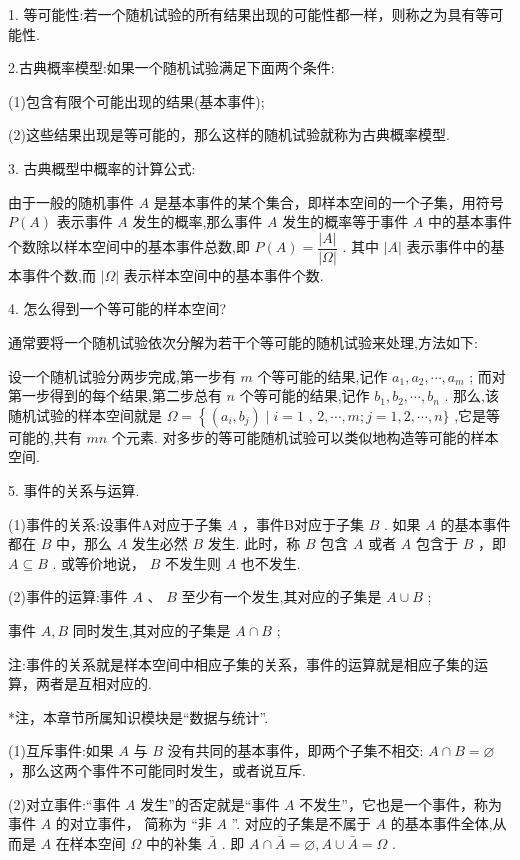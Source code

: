 1. 等可能性:若一个随机试验的所有结果出现的可能性都一样，则称之为具有等可能性.

2.古典概率模型:如果一个随机试验满足下面两个条件:

(1)包含有限个可能出现的结果(基本事件);

(2)这些结果出现是等可能的，那么这样的随机试验就称为古典概率模型.

3. 古典概型中概率的计算公式:

由于一般的随机事件 $A$ 是基本事件的某个集合，即样本空间的一个子集，用符号 $P\left( A\right)$ 表示事件 $A$ 发生的概率,那么事件 $A$ 发生的概率等于事件 $A$ 中的基本事件个数除以样本空间中的基本事件总数,即 $P\left( A\right)  = \dfrac{\left| A\right| }{\left| \Omega \right| }$ . 其中 $\left| A\right|$ 表示事件中的基本事件个数,而 $\left| \Omega \right|$ 表示样本空间中的基本事件个数.

4. 怎么得到一个等可能的样本空间?

通常要将一个随机试验依次分解为若干个等可能的随机试验来处理,方法如下:

设一个随机试验分两步完成,第一步有 $m$ 个等可能的结果,记作 ${a}_{1},{a}_{2},\cdots ,{a}_{m}$ ; 而对第一步得到的每个结果,第二步总有 $n$ 个等可能的结果,记作 ${b}_{1},{b}_{2},\cdots ,{b}_{n}$ . 那么,该随机试验的样本空间就是 $\Omega  = \left\{  {\left( {{a}_{i},{b}_{j}}\right)  \mid  i = 1}\right.$ , $2,\cdots ,m;j = 1,2,\cdots ,n\}$ ,它是等可能的,共有 ${mn}$ 个元素. 对多步的等可能随机试验可以类似地构造等可能的样本空间.

5. 事件的关系与运算.

(1)事件的关系:设事件A对应于子集 $A$ ，事件B对应于子集 $B$ . 如果 $A$ 的基本事件都在 $B$ 中，那么 $A$ 发生必然 $B$ 发生. 此时，称 $B$ 包含 $A$ 或者 $A$ 包含于 $B$ ，即 $A \subseteq  B$ . 或等价地说， $B$ 不发生则 $A$ 也不发生.

(2)事件的运算:事件 $A$ 、 $B$ 至少有一个发生,其对应的子集是 $A \cup  B$ ;

事件 $A,B$ 同时发生,其对应的子集是 $A \cap  B$ ;

注:事件的关系就是样本空间中相应子集的关系，事件的运算就是相应子集的运算，两者是互相对应的.



*注，本章节所属知识模块是“数据与统计”.



(1)互斥事件:如果 $A$ 与 $B$ 没有共同的基本事件，即两个子集不相交: $A \cap  B = \varnothing$ ，那么这两个事件不可能同时发生，或者说互斥.

(2)对立事件:“事件 $A$ 发生”的否定就是“事件 $A$ 不发生”，它也是一个事件，称为事件 $A$ 的对立事件， 简称为 “非 $A$ ”. 对应的子集是不属于 $A$ 的基本事件全体,从而是 $A$ 在样本空间 $\Omega$ 中的补集 $\bar{A}$ . 即 $A \cap  \bar{A} =  \varnothing ,A \cup  \bar{A} = \Omega$ .

